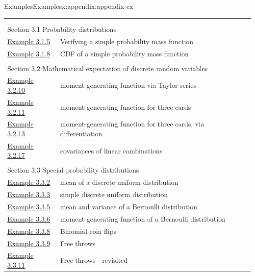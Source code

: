 \documentclass[oneside,10pt,]{book}
\begin{document}
\begin{appendixptx}{Examples}{}{Examples}{}{}{x:appendix:appendix-ex}
\noindent
\begin{longtable}[l]{ll}
\addtocounter{table}{-1}
\endfirsthead
\endhead
\multicolumn{2}{r}{(Continued on next page)}\\
\endfoot
\endlastfoot
\multicolumn{2}{l}{\null}\\[1.5ex] \multicolumn{2}{l}{\large Section 3.1 Probability distributions}\\[0.5ex]
\hyperref[x:example:ex-disc-pmf]{Example 3.1.5}& Verifying a simple probability mass function\\
\hyperref[x:example:ex-disc-pmf-to-cdf]{Example 3.1.8}& CDF of a simple probability mass function\\
\multicolumn{2}{l}{\null}\\[1.5ex] \multicolumn{2}{l}{\large Section 3.2 Mathematical expectation of discrete random variables}\\[0.5ex]
\hyperref[x:example:ex-maclaurin]{Example 3.2.10}& moment-generating function via Taylor series\\
\hyperref[x:example:ex-three-cards-mgf]{Example 3.2.11}& moment-generating function for three cards\\
\hyperref[x:example:ex-three-cards-mgf2]{Example 3.2.13}& moment-generating function for three cards, via differentiation\\
\hyperref[x:example:ex-var-covar]{Example 3.2.17}& covariances of linear combinations\\
\multicolumn{2}{l}{\null}\\[1.5ex] \multicolumn{2}{l}{\large Section 3.3 Special probability distributions}\\[0.5ex]
\hyperref[x:example:ex-disc-unif-mean]{Example 3.3.2}& mean of a discrete uniform distribution\\
\hyperref[x:example:ex-disc-unif-simple]{Example 3.3.3}& simple discrete uniform distribution\\
\hyperref[x:example:ex-bern-mean-var]{Example 3.3.5}& mean and variance of a Bernoulli distribution\\
\hyperref[x:example:ex-bern-mgf]{Example 3.3.6}& moment-generating function of a Bernoulli distribution\\
\hyperref[x:example:ex-bin-coins]{Example 3.3.8}& Binomial coin flips\\
\hyperref[x:example:ex-bin-bball]{Example 3.3.9}& Free throws\\
\hyperref[x:example:ex-bin-bball2]{Example 3.3.11}& Free throws - revisited\\

\end{longtable}
\end{appendixptx}
\end{document}
